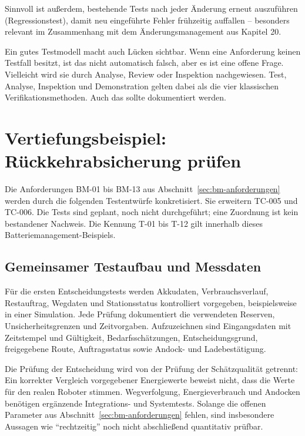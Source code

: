 Sinnvoll ist außerdem, bestehende Tests nach jeder Änderung erneut auszuführen (Regressionstest), damit neu eingeführte Fehler frühzeitig auffallen – besonders relevant im Zusammenhang mit dem Änderungsmanagement aus Kapitel 20.

Ein gutes Testmodell macht auch Lücken sichtbar. Wenn eine Anforderung keinen Testfall besitzt, ist das nicht automatisch falsch, aber es ist eine offene Frage. Vielleicht wird sie durch Analyse, Review oder Inspektion nachgewiesen. Test, Analyse, Inspektion und Demonstration gelten dabei als die vier klassischen Verifikationsmethoden. Auch das sollte dokumentiert werden.

\section{Vertiefungsbeispiel: Rückkehrabsicherung prüfen}
\label{sec:bm-tests}
Die Anforderungen BM-01 bis BM-13 aus Abschnitt~\ref{sec:bm-anforderungen} werden durch die folgenden Testentwürfe konkretisiert. Sie erweitern TC-005 und TC-006. Die Tests sind geplant, noch nicht durchgeführt; eine Zuordnung ist kein bestandener Nachweis. Die Kennung T-01 bis T-12 gilt innerhalb dieses Batteriemanagement-Beispiels.

\subsection{Gemeinsamer Testaufbau und Messdaten}
Für die ersten Entscheidungstests werden Akkudaten, Verbrauchsverlauf, Restauftrag, Wegdaten und Stationsstatus kontrolliert vorgegeben, beispielsweise in einer Simulation. Jede Prüfung dokumentiert die verwendeten Reserven, Unsicherheitsgrenzen und Zeitvorgaben. Aufzuzeichnen sind Eingangsdaten mit Zeitstempel und Gültigkeit, Bedarfsschätzungen, Entscheidungsgrund, freigegebene Route, Auftragsstatus sowie Andock- und Ladebestätigung.

Die Prüfung der Entscheidung wird von der Prüfung der Schätzqualität getrennt: Ein korrekter Vergleich vorgegebener Energiewerte beweist nicht, dass die Werte für den realen Roboter stimmen. Wegverfolgung, Energieverbrauch und Andocken benötigen ergänzende Integrations- und Systemtests. Solange die offenen Parameter aus Abschnitt~\ref{sec:bm-anforderungen} fehlen, sind insbesondere Aussagen wie \enquote{rechtzeitig} noch nicht abschließend quantitativ prüfbar.

